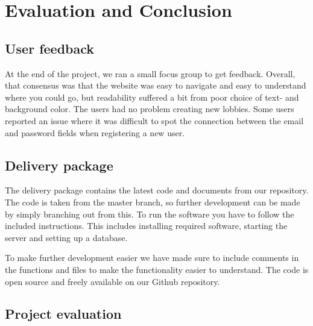 \section {Evaluation and Conclusion}
\subsection{User feedback}
At the end of the project, we ran a small focus group to get feedback. Overall, that consensus was that the website was easy to navigate and easy to understand where you could go, but readability suffered a bit from poor choice of text- and background color. The users had no problem creating new lobbies. Some users reported an issue where it was difficult to spot the connection between the email and password fields when registering a new user.

\subsection{Delivery package}
The delivery package contains the latest code and documents from our repository. The code is taken from the master branch, so further development can be made by simply branching out from this. To run the software you have to follow the included instructions. This includes installing required software, starting the server and setting up a database. 

To make further development easier we have made sure to include comments in the functions and files to make the functionality easier to understand. The code is open source and freely available on our Github repository.

\subsection{Project evaluation}

